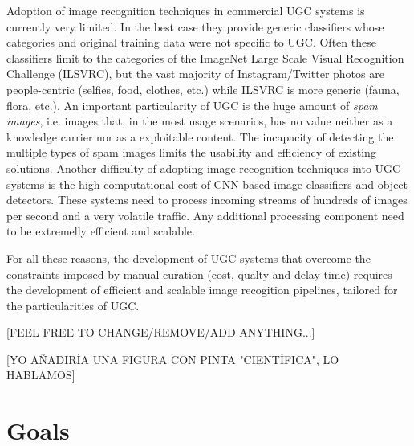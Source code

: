 Adoption of image recognition techniques in commercial UGC systems is currently very limited. In the best case they provide generic classifiers whose categories and original training data were not specific to UGC. Often these classifiers limit to the categories of the ImageNet Large Scale Visual Recognition Challenge (ILSVRC), but the vast majority of Instagram/Twitter photos are people-centric (selfies, food, clothes, etc.) while ILSVRC is more generic (fauna, flora, etc.). An important particularity of UGC is the huge amount of \textit{spam images}, i.e. images that, in the most usage scenarios, has no value neither as a knowledge carrier nor as a exploitable content. The incapacity of detecting the multiple types of spam images limits the usability and efficiency of existing solutions. Another difficulty of adopting image recognition techniques into UGC systems is the high computational cost of CNN-based image classifiers and object detectors. These systems need to process incoming streams of hundreds of images per second and a very volatile traffic. Any additional processing component need to be extremelly efficient and scalable. 

For all these reasons, the development of UGC systems that overcome the constraints imposed by manual curation (cost, qualty and delay time) requires the development of efficient and scalable image recogition pipelines, tailored for the particularities of UGC. 

[FEEL FREE TO CHANGE/REMOVE/ADD ANYTHING...]

[YO AÑADIRÍA UNA FIGURA CON PINTA "CIENTÍFICA", LO HABLAMOS]








\section{Goals} %


